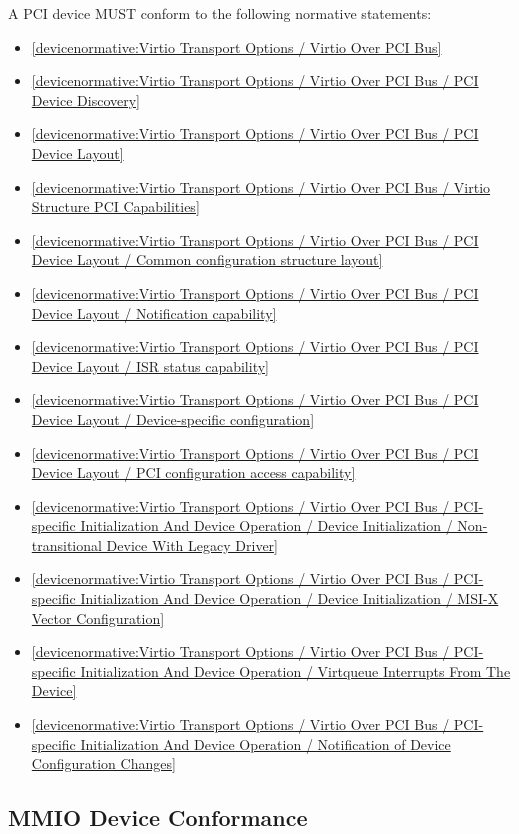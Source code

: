 A PCI device MUST conform to the following normative statements:

\begin{itemize}
\item \ref{devicenormative:Virtio Transport Options / Virtio Over PCI Bus}
\item \ref{devicenormative:Virtio Transport Options / Virtio Over PCI Bus / PCI Device Discovery}
\item \ref{devicenormative:Virtio Transport Options / Virtio Over PCI Bus / PCI Device Layout}
\item \ref{devicenormative:Virtio Transport Options / Virtio Over PCI Bus / Virtio Structure PCI Capabilities}
\item \ref{devicenormative:Virtio Transport Options / Virtio Over PCI Bus / PCI Device Layout / Common configuration structure layout}
\item \ref{devicenormative:Virtio Transport Options / Virtio Over PCI Bus / PCI Device Layout / Notification capability}
\item \ref{devicenormative:Virtio Transport Options / Virtio Over PCI Bus / PCI Device Layout / ISR status capability}
\item \ref{devicenormative:Virtio Transport Options / Virtio Over PCI Bus / PCI Device Layout / Device-specific configuration}
\item \ref{devicenormative:Virtio Transport Options / Virtio Over PCI Bus / PCI Device Layout / PCI configuration access capability}
\item \ref{devicenormative:Virtio Transport Options / Virtio Over PCI Bus / PCI-specific Initialization And Device Operation / Device Initialization / Non-transitional Device With Legacy Driver}
\item \ref{devicenormative:Virtio Transport Options / Virtio Over PCI Bus / PCI-specific Initialization And Device Operation / Device Initialization / MSI-X Vector Configuration}
\item \ref{devicenormative:Virtio Transport Options / Virtio Over PCI Bus / PCI-specific Initialization And Device Operation / Virtqueue Interrupts From The Device}
\item \ref{devicenormative:Virtio Transport Options / Virtio Over PCI Bus / PCI-specific Initialization And Device Operation / Notification of Device Configuration Changes}
\end{itemize}

\subsection{MMIO Device Conformance}\label{sec:Conformance / Device Conformance / MMIO Device Conformance}


